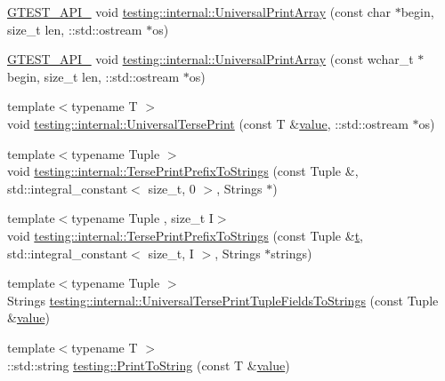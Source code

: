\begin{DoxyCompactItemize}
\item 
\mbox{\hyperlink{_obj__test_2lib_2googletest-release-1_88_81_2googletest_2include_2gtest_2internal_2gtest-port_8h_aa73be6f0ba4a7456180a94904ce17790}{G\+T\+E\+S\+T\+\_\+\+A\+P\+I\+\_\+}} void \mbox{\hyperlink{namespacetesting_1_1internal_a72c997dbd2c562110b2cb56c359decfa}{testing\+::internal\+::\+Universal\+Print\+Array}} (const char $\ast$begin, size\+\_\+t len, \+::std\+::ostream $\ast$os)
\item 
\mbox{\hyperlink{_obj__test_2lib_2googletest-release-1_88_81_2googletest_2include_2gtest_2internal_2gtest-port_8h_aa73be6f0ba4a7456180a94904ce17790}{G\+T\+E\+S\+T\+\_\+\+A\+P\+I\+\_\+}} void \mbox{\hyperlink{namespacetesting_1_1internal_ae31e146c35fd75afc6a9cc73ae2692d1}{testing\+::internal\+::\+Universal\+Print\+Array}} (const wchar\+\_\+t $\ast$begin, size\+\_\+t len, \+::std\+::ostream $\ast$os)
\item 
{\footnotesize template$<$typename T $>$ }\\void \mbox{\hyperlink{namespacetesting_1_1internal_afa92f5a284929dc3723e654a25feb7b9}{testing\+::internal\+::\+Universal\+Terse\+Print}} (const T \&\mbox{\hyperlink{_obj__test_2lib_2googletest-master_2googlemock_2test_2gmock-matchers__test_8cc_a337b8a670efc0b086ad3af163f3121b6}{value}}, \+::std\+::ostream $\ast$os)
\item 
{\footnotesize template$<$typename Tuple $>$ }\\void \mbox{\hyperlink{namespacetesting_1_1internal_a6300aa1440d0019cf08d9a1f6efd4382}{testing\+::internal\+::\+Terse\+Print\+Prefix\+To\+Strings}} (const Tuple \&, std\+::integral\+\_\+constant$<$ size\+\_\+t, 0 $>$, Strings $\ast$)
\item 
{\footnotesize template$<$typename Tuple , size\+\_\+t I$>$ }\\void \mbox{\hyperlink{namespacetesting_1_1internal_ab244273c02742a3fac45cc241befc536}{testing\+::internal\+::\+Terse\+Print\+Prefix\+To\+Strings}} (const Tuple \&\mbox{\hyperlink{_mutual_8h_a978d88b393c8a37dc2614c88788b3442}{t}}, std\+::integral\+\_\+constant$<$ size\+\_\+t, I $>$, Strings $\ast$strings)
\item 
{\footnotesize template$<$typename Tuple $>$ }\\Strings \mbox{\hyperlink{namespacetesting_1_1internal_a7e60d1478b074801c766eeee9be6c772}{testing\+::internal\+::\+Universal\+Terse\+Print\+Tuple\+Fields\+To\+Strings}} (const Tuple \&\mbox{\hyperlink{_obj__test_2lib_2googletest-master_2googlemock_2test_2gmock-matchers__test_8cc_a337b8a670efc0b086ad3af163f3121b6}{value}})
\item 
{\footnotesize template$<$typename T $>$ }\\\+::std\+::string \mbox{\hyperlink{namespacetesting_aa5717bb1144edd1d262d310ba70c82ed}{testing\+::\+Print\+To\+String}} (const T \&\mbox{\hyperlink{_obj__test_2lib_2googletest-master_2googlemock_2test_2gmock-matchers__test_8cc_a337b8a670efc0b086ad3af163f3121b6}{value}})
\end{DoxyCompactItemize}
